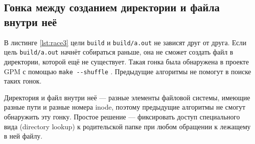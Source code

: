 \subsection{Гонка между созданием директории и файла внутри неё}
\label{subsec:dir-race}



В листинге \ref{lst:race3} цели \texttt{build} и \texttt{build/a.out} не зависят друг от друга. Если цель \texttt{build/a.out} начнёт собираться раньше, она не сможет создать файл в директории, которой ещё не существует. Такая гонка была обнаружена в проекте GPM с помощью \texttt{make {-}{-}shuffle} \cite{race-3-example}. Предыдущие алгоритмы не помогут в поиске таких гонок.

Директория и файл внутри неё --- разные элементы файловой системы, имеющие разные пути и разные номера inode, поэтому предыдущие алгоритмы не смогут обнаружить эту гонку. Простое решение --- фиксировать доступ специального вида (directory lookup) к родительской папке при любом обращении к лежащему в ней файлу.







